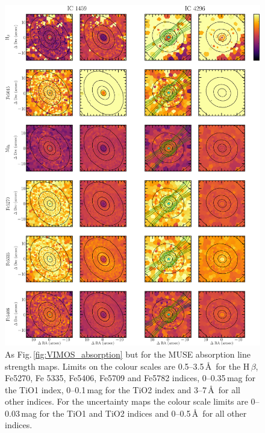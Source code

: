 		\begin{figure}
			\centering
			\includegraphics[height=0.81\textheight]{chapter4/muse/abs1.png}
			\caption[MUSE absorption line strength maps]{As Fig.\,\ref{fig:VIMOS_absorption} but for the MUSE absorption line strength maps. Limits on the colour scales are 0.5--3.5\,\AA\ for the H\,$\beta$, Fe5270, Fe 5335, Fe5406, Fe5709 and Fe5782 indices, 0--0.35\,mag for the TiO1 index, 0--0.1\,mag for the TiO2 index and 3--7\,\AA\ for all other indices. For the uncertainty maps the colour scale limits are 0--0.03\,mag for the TiO1 and TiO2 indices and 0--0.5\,\AA\ for all other indices.}
			\label{fig:MUSE_absorption}
		\end{figure}
